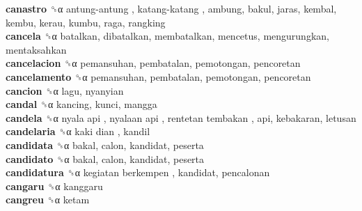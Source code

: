 \textbf{canastro} ␝α   antung-antung ,  katang-katang , ambung, bakul, jaras, kembal, kembu, kerau, kumbu, raga, rangking  \\
\textbf{cancela} ␝α  batalkan, dibatalkan, membatalkan, mencetus, mengurungkan, mentaksahkan  \\
\textbf{cancelacion} ␝α  pemansuhan, pembatalan, pemotongan, pencoretan  \\
\textbf{cancelamento} ␝α  pemansuhan, pembatalan, pemotongan, pencoretan  \\
\textbf{cancion} ␝α  lagu, nyanyian  \\
\textbf{candal} ␝α  kancing, kunci, mangga  \\
\textbf{candela} ␝α   nyala api ,  nyalaan api ,  rentetan tembakan , api, kebakaran, letusan  \\
\textbf{candelaria} ␝α   kaki dian , kandil  \\
\textbf{candidata} ␝α  bakal, calon, kandidat, peserta  \\
\textbf{candidato} ␝α  bakal, calon, kandidat, peserta  \\
\textbf{candidatura} ␝α   kegiatan berkempen , kandidat, pencalonan  \\
\textbf{cangaru} ␝α  kanggaru  \\
\textbf{cangreu} ␝α  ketam  \\
